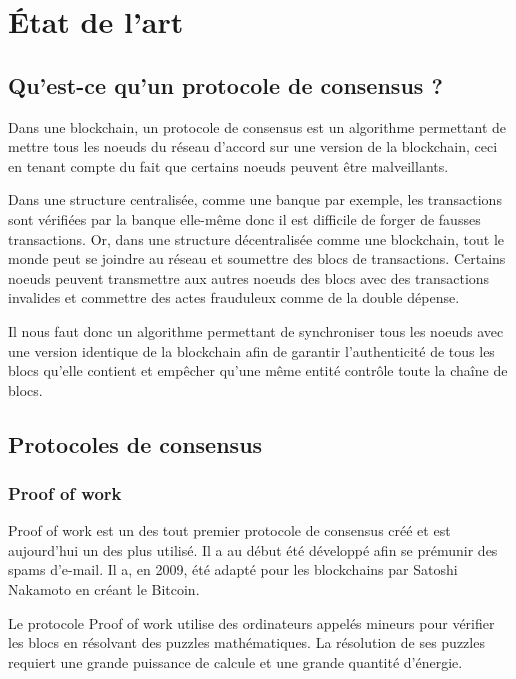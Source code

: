 \chapter{État de l'art}
\label{ch:etat_art}

\section{Qu'est-ce qu'un protocole de consensus ?}

Dans une blockchain, un protocole de consensus est un algorithme permettant de mettre tous les noeuds du réseau d'accord sur une version de la blockchain, ceci en tenant compte du fait que certains noeuds peuvent être malveillants.

Dans une structure centralisée, comme une banque par exemple, les transactions sont vérifiées par la banque elle-même donc il est difficile de forger de fausses transactions. Or, dans une structure décentralisée comme une blockchain, tout le monde peut se joindre au réseau et soumettre des blocs de transactions. Certains noeuds peuvent transmettre aux autres noeuds des blocs avec des transactions invalides et commettre des actes frauduleux comme de la double dépense.

Il nous faut donc un algorithme permettant de synchroniser tous les noeuds avec une version identique de la blockchain afin de garantir l'authenticité de tous les blocs qu'elle contient et empêcher qu'une même entité contrôle toute la chaîne de blocs.

\section{Protocoles de consensus}

\subsection{Proof of work}

Proof of work est un des tout premier protocole de consensus créé et est aujourd'hui un des plus utilisé. Il a au début été développé afin se prémunir des spams d'e-mail. Il a, en 2009, été adapté pour les blockchains par Satoshi Nakamoto en créant le Bitcoin.

Le protocole Proof of work utilise des ordinateurs appelés mineurs pour vérifier les blocs en résolvant des puzzles mathématiques. La résolution de ses puzzles requiert une grande puissance de calcule et une grande quantité d'énergie.

